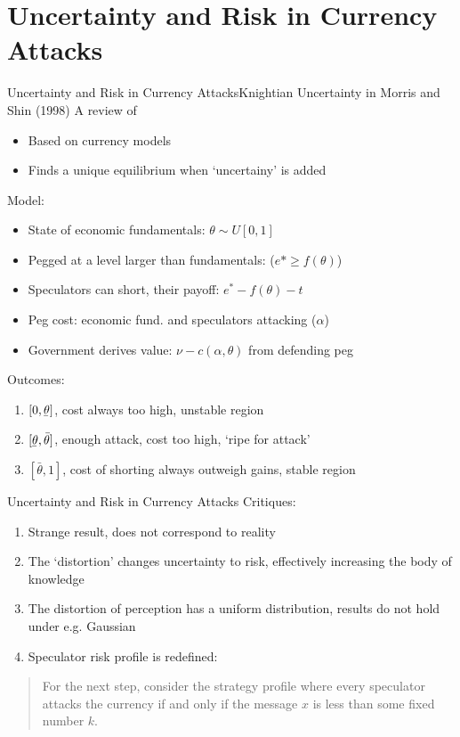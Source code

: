 \documentclass{beamer}
\begin{document}
\section[Uncertainty, Currency Attacks]{Uncertainty and Risk in Currency Attacks}

\begin{frame}{Uncertainty and Risk in Currency Attacks}{Knightian Uncertainty in Morris and Shin (1998)}
A review of  \parencite{morris1998unique}
	\begin{itemize}
		\item Based on currency models \textcite{obstfeld1986rational,obstfeld1995logic,obstfeld1996models}
		\item Finds a unique equilibrium when `uncertainy' is added
	\end{itemize}
	Model:
	\begin{itemize}
		\item State of economic fundamentals: $\theta \sim U[0,1]$
		\item Pegged at a level larger than fundamentals: ($e* \geq f(\theta)$)
		\item Speculators can short, their payoff: $e^* - f(\theta) - t$
		\item Peg cost: economic fund. and speculators attacking ($\alpha$)
		\item Government derives value: $\nu - c(\alpha, \theta)$ from defending peg
	\end{itemize}
	Outcomes:
	\begin{enumerate}
		\item $ [0, \underaccent{\bar}{\theta} ] $, cost always too high, unstable region
		\item $[\underaccent{\bar}{\theta}, \bar{\theta}]$, enough attack, cost too high, `ripe for attack'
		\item $[\bar{\theta}, 1]$, cost of shorting always outweigh gains, stable region
	\end{enumerate}
\end{frame}

\begin{frame}{Uncertainty and Risk in Currency Attacks}
	Critiques:
	\begin{enumerate}
	
		\item Strange result, does not correspond to reality
		\item The `distortion' changes uncertainty to risk, effectively increasing the body of knowledge
		\item The distortion of perception has a uniform distribution, results do not hold under e.g. Gaussian
		\item Speculator risk profile is redefined:
	\end{enumerate}
	\begin{quotation}
		For the next step,
		consider the strategy profile where every speculator attacks the currency if and only if
		the message $x$ is less than some fixed number $k$.
		\parencite[p.~592]{morris1998unique}
	\end{quotation}
\end{frame}
\end{document}
